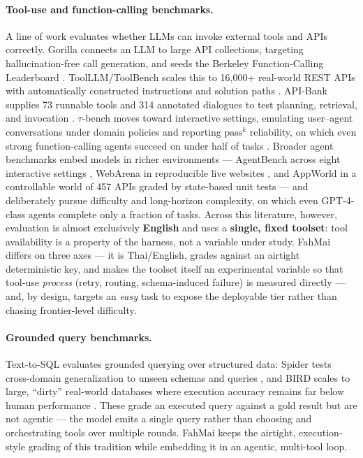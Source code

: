 \documentclass[11pt]{article}
\begin{document}
\paragraph{Tool-use and function-calling benchmarks.} A line of work evaluates whether LLMs can invoke
external tools and APIs correctly. Gorilla connects an LLM to large API collections, targeting
hallucination-free call generation, and seeds the Berkeley Function-Calling Leaderboard
\citep{patil2023gorilla}. ToolLLM/ToolBench scales this to 16{,}000+ real-world REST APIs with
automatically constructed instructions and solution paths \citep{qin2023toolllm}. API-Bank supplies 73
runnable tools and 314 annotated dialogues to test planning, retrieval, and invocation
\citep{li2023apibank}. $\tau$-bench moves toward interactive settings, emulating user--agent
conversations under domain policies and reporting $\text{pass}^k$ reliability, on which even strong
function-calling agents succeed on under half of tasks \citep{yao2024taubench}. Broader agent
benchmarks embed models in richer environments --- AgentBench across eight interactive settings
\citep{liu2023agentbench}, WebArena in reproducible live websites \citep{zhou2023webarena}, and
AppWorld in a controllable world of 457 APIs graded by state-based unit tests
\citep{trivedi2024appworld} --- and deliberately pursue difficulty and long-horizon complexity, on
which even GPT-4-class agents complete only a fraction of tasks. Across this literature, however,
evaluation is almost exclusively \textbf{English} and uses a \textbf{single, fixed toolset}: tool
availability is a property of the harness, not a variable under study. FahMai differs on three axes ---
it is Thai/English, grades against an airtight deterministic key, and makes the toolset itself an
experimental variable so that tool-use \emph{process} (retry, routing, schema-induced failure) is
measured directly --- and, by design, targets an \emph{easy} task to expose the deployable tier rather
than chasing frontier-level difficulty.

\paragraph{Grounded query benchmarks.} Text-to-SQL evaluates grounded querying over structured data:
Spider tests cross-domain generalization to unseen schemas and queries \citep{yu2018spider}, and BIRD
scales to large, ``dirty'' real-world databases where execution accuracy remains far below human
performance \citep{li2023bird}. These grade an executed query against a gold result but are not
agentic --- the model emits a single query rather than choosing and orchestrating tools over multiple
rounds. FahMai keeps the airtight, execution-style grading of this tradition while embedding it in an
agentic, multi-tool loop.
\end{document}
